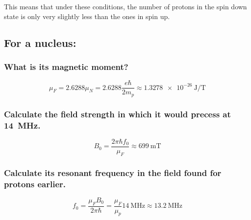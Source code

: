 \documentclass[a4paper]{scrartcl}
\begin{document}
This means that under these conditions, the number of protons in the spin down state is only very slightly less than the ones in spin up.

\subsection{For a  nucleus:}
\subsubsection{What is its magnetic moment?}
\[\mu_F = 2.6288 \mu_N = 2.6288 \frac{e \hbar}{2 m_p} \approx \SI{1.3278e-26}{\joule\per\tesla}\]\cite{NIST}

\subsubsection{Calculate the field strength in which it would precess at \SI{14}{\mega\hertz}.}
\[B_0 = \frac{2 \pi \hbar f_0}{\mu_F} \approx \SI{699}{\milli\tesla}\]

\subsubsection{Calculate its resonant frequency in the field found for protons earlier.}
\[f_0 = \frac{\mu_F B_0}{2 \pi \hbar} = \frac{\mu_F}{\mu_p} \SI{14}{\mega\hertz} \approx \SI{13.2}{\mega\hertz}\]

\printbibliography
\end{document}
